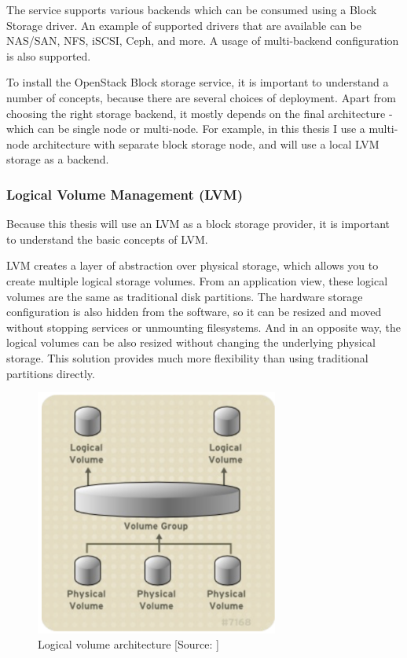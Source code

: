 The service supports various backends which can be consumed using a Block Storage driver. An example of supported drivers that are available can be NAS/SAN, NFS, iSCSI, Ceph, and more. A usage of multi-backend configuration is also supported. \cite{InstallGuide}

To install the OpenStack Block storage service, it is important to understand a number of concepts, because there are several choices of deployment. \cite{OperationsGuide} Apart from choosing the right storage backend, it mostly depends on the final architecture - which can be single node or multi-node. For example, in this thesis I use a multi-node architecture with separate block storage node, and will use a local LVM storage as a backend.

\subsubsection*{Logical Volume Management (LVM)}
Because this thesis will use an LVM as a block storage provider, it is important to understand the basic concepts of LVM.

LVM creates a layer of abstraction over physical storage, which allows you to create multiple logical storage volumes. From an application view, these logical volumes are the same as traditional disk partitions. The hardware storage configuration is also hidden from the software, so it can be resized and moved without stopping services or unmounting filesystems. And in an opposite way, the logical volumes can be also resized without changing the underlying physical storage. This solution provides much more flexibility than using traditional partitions directly. \cite{LVMPdf}

\begin{figure}[!h]
  \centerline{\includegraphics[width=8cm]{fig/lvm_architecture.png}}
  \caption{Logical volume architecture [Source: \cite{lvmArch}]}
  \label{fig:lvm_architecture}
\end{figure}

